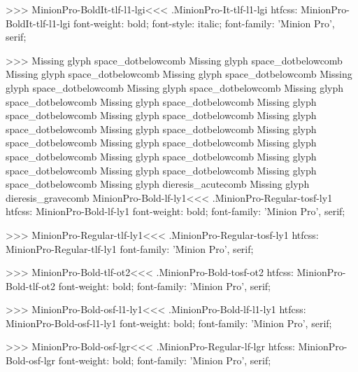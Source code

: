 {>>>
\<MinionPro-BoldIt-tlf-l1-lgi\><<<
.MinionPro-It-tlf-l1-lgi
htfcss:  MinionPro-BoldIt-tlf-l1-lgi  font-weight: bold; font-style: italic; font-family: 'Minion Pro', serif;

>>>
Missing glyph	space_dotbelowcomb
Missing glyph	space_dotbelowcomb
Missing glyph	space_dotbelowcomb
Missing glyph	space_dotbelowcomb
Missing glyph	space_dotbelowcomb
Missing glyph	space_dotbelowcomb
Missing glyph	space_dotbelowcomb
Missing glyph	space_dotbelowcomb
Missing glyph	space_dotbelowcomb
Missing glyph	space_dotbelowcomb
Missing glyph	space_dotbelowcomb
Missing glyph	space_dotbelowcomb
Missing glyph	space_dotbelowcomb
Missing glyph	space_dotbelowcomb
Missing glyph	space_dotbelowcomb
Missing glyph	space_dotbelowcomb
Missing glyph	space_dotbelowcomb
Missing glyph	space_dotbelowcomb
Missing glyph	space_dotbelowcomb
Missing glyph	dieresis_acutecomb
Missing glyph	dieresis_gravecomb
\<MinionPro-Bold-lf-ly1\><<<
.MinionPro-Regular-tosf-ly1
htfcss:  MinionPro-Bold-lf-ly1  font-weight: bold; font-family: 'Minion Pro', serif;

>>>
\<MinionPro-Regular-tlf-ly1\><<<
.MinionPro-Regular-tosf-ly1
htfcss:  MinionPro-Regular-tlf-ly1  font-family: 'Minion Pro', serif;

>>>
\<MinionPro-Bold-tlf-ot2\><<<
.MinionPro-Bold-tosf-ot2
htfcss:  MinionPro-Bold-tlf-ot2  font-weight: bold; font-family: 'Minion Pro', serif;

>>>
\<MinionPro-Bold-osf-l1-ly1\><<<
.MinionPro-Bold-lf-l1-ly1
htfcss:  MinionPro-Bold-osf-l1-ly1  font-weight: bold; font-family: 'Minion Pro', serif;

>>>
\<MinionPro-Bold-osf-lgr\><<<
.MinionPro-Regular-lf-lgr
htfcss:  MinionPro-Bold-osf-lgr  font-weight: bold; font-family: 'Minion Pro', serif;

}
